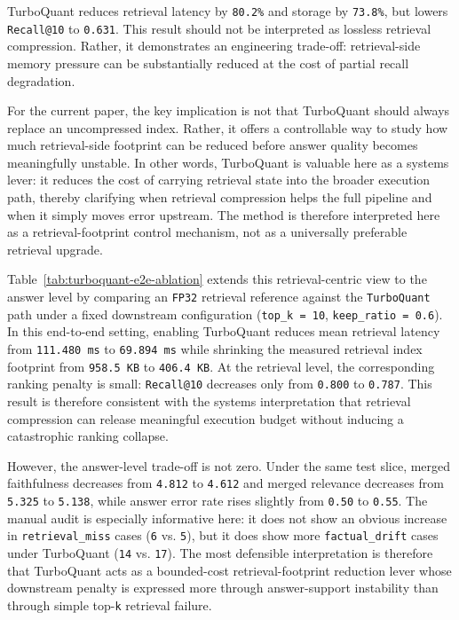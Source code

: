 \documentclass[10pt,twocolumn]{article}
\begin{document}
TurboQuant reduces retrieval latency by \texttt{80.2\%} and storage by \texttt{73.8\%}, but lowers \texttt{Recall@10} to \texttt{0.631}. This result should not be interpreted as lossless retrieval compression. Rather, it demonstrates an engineering trade-off: retrieval-side memory pressure can be substantially reduced at the cost of partial recall degradation.

For the current paper, the key implication is not that TurboQuant should always replace an uncompressed index. Rather, it offers a controllable way to study how much retrieval-side footprint can be reduced before answer quality becomes meaningfully unstable. In other words, TurboQuant is valuable here as a systems lever: it reduces the cost of carrying retrieval state into the broader execution path, thereby clarifying when retrieval compression helps the full pipeline and when it simply moves error upstream. The method is therefore interpreted here as a retrieval-footprint control mechanism, not as a universally preferable retrieval upgrade.



Table~\ref{tab:turboquant-e2e-ablation} extends this retrieval-centric view to the answer level by comparing an \texttt{FP32} retrieval reference against the \texttt{TurboQuant} path under a fixed downstream configuration (\texttt{top\_k = 10}, \texttt{keep\_ratio = 0.6}). In this end-to-end setting, enabling TurboQuant reduces mean retrieval latency from \texttt{111.480 ms} to \texttt{69.894 ms} while shrinking the measured retrieval index footprint from \texttt{958.5 KB} to \texttt{406.4 KB}. At the retrieval level, the corresponding ranking penalty is small: \texttt{Recall@10} decreases only from \texttt{0.800} to \texttt{0.787}. This result is therefore consistent with the systems interpretation that retrieval compression can release meaningful execution budget without inducing a catastrophic ranking collapse.

However, the answer-level trade-off is not zero. Under the same test slice, merged faithfulness decreases from \texttt{4.812} to \texttt{4.612} and merged relevance decreases from \texttt{5.325} to \texttt{5.138}, while answer error rate rises slightly from \texttt{0.50} to \texttt{0.55}. The manual audit is especially informative here: it does not show an obvious increase in \texttt{retrieval\_miss} cases (\texttt{6} vs. \texttt{5}), but it does show more \texttt{factual\_drift} cases under TurboQuant (\texttt{14} vs. \texttt{17}). The most defensible interpretation is therefore that TurboQuant acts as a bounded-cost retrieval-footprint reduction lever whose downstream penalty is expressed more through answer-support instability than through simple top-\texttt{k} retrieval failure.
\end{document}
